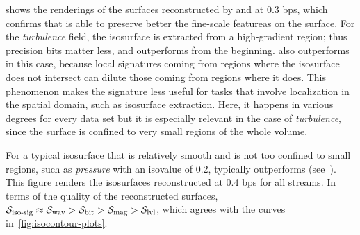  shows the renderings of the surfaces reconstructed by \sbit
and \swav at 0.3 bps, which confirms that \sbit is able to preserve better the fine-scale featureas
on the surface. For the \emph{turbulence} field, the isosurface is extracted from a high-gradient
region; thus precision bits matter less, and \sbit outperforms \swav from the beginning. \sbit also
outperforms \sisg in this case, because local signatures coming from regions where the isosurface
does not intersect can dilute those coming from regions where it does. This phenomenon makes the
signature less useful for tasks that involve localization in the spatial domain, such as isosurface
extraction. Here, it happens in various degrees for every data set but it is especially relevant in
the case of \emph{turbulence}, since the surface is confined to very small regions of the whole
volume.

For a typical isosurface that is relatively smooth and is not too confined to small regions, such as
\emph{pressure} with an isovalue of 0.2, \swav typically outperforms \sbit
(see~). This figure renders the isosurfaces reconstructed at
0.4 bps for all streams. In terms of the quality of the reconstructed surfaces, $\sisg \approx \swav
> \sbit > \smag > \slvl$, which agrees with the curves in~\autoref{fig:isocontour-plots}. 
